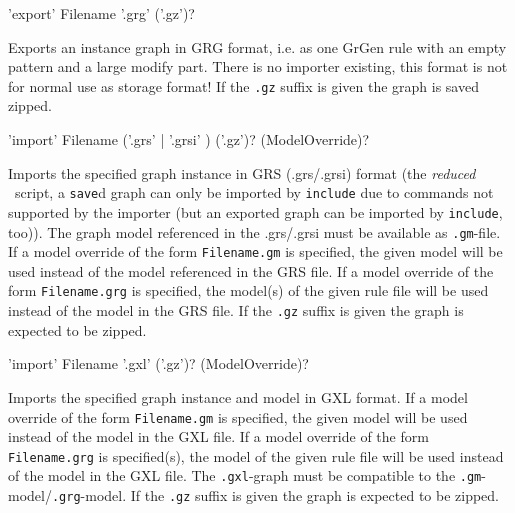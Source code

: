 
\begin{rail}
  'export' Filename '.grg' ('.gz')?
\end{rail}
Exports an instance graph in GRG format, i.e. as one GrGen rule with an empty pattern and a large modify part.
There is no importer existing, this format is not for normal use as storage format!
If the \texttt{.gz} suffix is given the graph is saved zipped.

\begin{rail}
  'import' Filename ('.grs' | '.grsi' ) ('.gz')? (ModelOverride)?
\end{rail}
Imports the specified graph instance in GRS (.grs/.grsi) format (the \emph{reduced} \GrShell\ script,
a \texttt{save}d graph can only be imported by \texttt{include} due to commands not supported by the importer (but an exported graph can be imported by \texttt{include}, too)).
The graph model referenced in the .grs/.grsi must be available as \texttt{.gm}-file.
If a model override of the form \texttt{Filename.gm} is specified, the given model will be used instead of the model referenced in the GRS file.
If a model override of the form \texttt{Filename.grg} is specified, the model(s) of the given rule file will be used instead of the model in the GRS file.
If the \texttt{.gz} suffix is given the graph is expected to be zipped.

\begin{rail}
  'import' Filename '.gxl' ('.gz')? (ModelOverride)?
\end{rail}
Imports the specified graph instance and model in GXL format.
If a model override of the form \texttt{Filename.gm} is specified, the given model will be used instead of the model in the GXL file.
If a model override of the form \texttt{Filename.grg} is specified(s), the model of the given rule file will be used instead of the model in the GXL file.
The \texttt{.gxl}-graph must be compatible to the \texttt{.gm}-model/\texttt{.grg}-model.
If the \texttt{.gz} suffix is given the graph is expected to be zipped.

